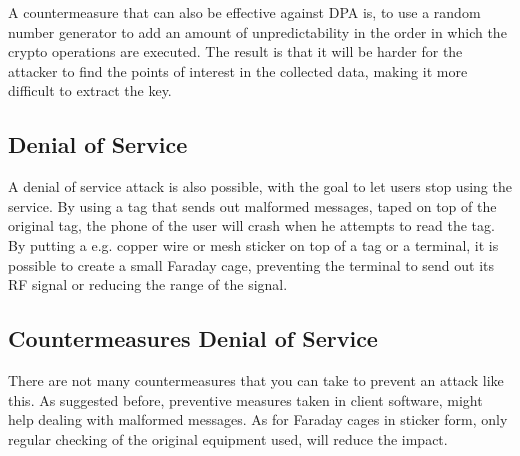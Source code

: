 A countermeasure that can also be effective against DPA is, to use a random number generator to add an amount of unpredictability in the order in which the crypto operations are executed.
The result is that it will be harder for the attacker to find the points of interest in the collected data, making it more difficult to extract the key. \cite{kocher2009differential}


\subsection{Denial of Service}
A denial of service attack is also possible, with the goal to let users stop using the service. By using a tag that sends out malformed messages, taped on top of the original tag, the phone of the user will crash when he attempts to read the tag.
By putting a e.g. copper wire or mesh sticker on top of a tag or a terminal, it is possible to create a small Faraday cage, preventing the terminal to send out its RF signal or reducing the range of the signal. \cite{rieback2006your}

\subsection{Countermeasures Denial of Service}
There are not many countermeasures that you can take to prevent an attack like this. As suggested before, preventive measures taken in client software, might help dealing with malformed messages. 
As for Faraday cages in sticker form, only regular checking of the original equipment used, will reduce the impact.

